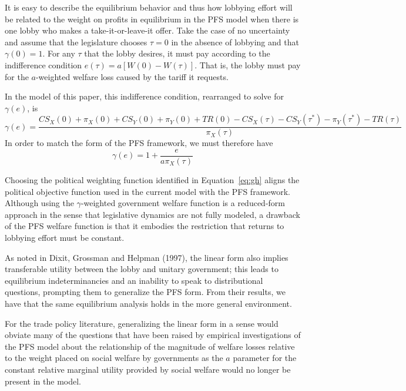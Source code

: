 \documentclass[10pt]{article}
\newcommand{\ga}{\gamma}
\begin{document}
It is easy to describe the equilibrium behavior and thus how lobbying effort will be related to the weight on profits in equilibrium in the PFS model when there is one lobby who makes a take-it-or-leave-it offer. Take the case of no uncertainty and assume that the legislature chooses $\tau=0$ in the absence of lobbying and that $\ga(0)=1$. For any $\tau$ that the lobby desires, it must pay according to the  indifference condition $e(\tau) = a \left[ W(0) - W(\tau) \right]$. That is, the lobby must pay for the $a$-weighted welfare loss caused by the tariff it requests.

In the model of this paper, this indifference condition, rearranged to solve for $\ga(e)$, is
		    \[
		      \ga(e) = \frac{\mathit{CS}_X(0) + \pi_X(0) + \mathit{CS}_Y(0) + \pi_Y(0) + \mathit{TR}(0) - \mathit{CS}_X(\tau) - \mathit{CS}_Y(\tau^*) - \pi_Y(\tau^*) - \mathit{TR}(\tau)}{\pi_X(\tau)}
		    \] 
In order to match the form of the PFS framework, we must therefore have
		    \begin{equation}
		      \ga(e) = 1 + \frac{e}{a\pi_X(\tau)}
		      \label{eq:gh}
		    \end{equation}

Choosing the political weighting function identified in Equation~\ref{eq:gh} aligns the political objective function used in the current model with the PFS framework. Although using the $\ga$-weighted government welfare function is a reduced-form approach in the sense that legislative dynamics are not fully modeled, a drawback of the PFS welfare function is that it embodies the restriction that returns to lobbying effort must be constant.

As noted in Dixit, Grossman and Helpman (1997), the linear form also implies transferable utility between the lobby and unitary government; this leads to equilibrium indeterminancies and an inability to speak to distributional questions, prompting them to generalize the PFS form. From their results, we have that the same equilibrium analysis holds in the more general environment.

For the trade policy literature, generalizing the linear form in a sense would obviate many of the questions that have been raised by empirical investigations of the PFS model about the relationship of the magnitude of welfare losses relative to the weight placed on social welfare by governments as the $a$ parameter for the constant relative marginal utility provided by social welfare would no longer be present in the model.
\end{document}
